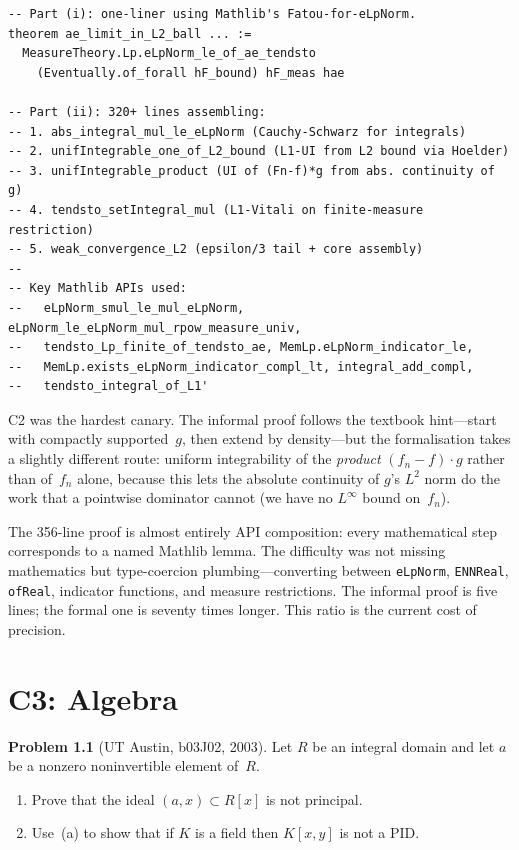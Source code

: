 \documentclass[12pt,oneside]{book}
\theoremstyle{plain}
\theoremstyle{definition}
\newtheorem{problem}{Problem}[chapter]
\theoremstyle{remark}
\begin{document}
\begin{leanbox}
\begin{Verbatim}[fontsize=\scriptsize]
-- Part (i): one-liner using Mathlib's Fatou-for-eLpNorm.
theorem ae_limit_in_L2_ball ... :=
  MeasureTheory.Lp.eLpNorm_le_of_ae_tendsto
    (Eventually.of_forall hF_bound) hF_meas hae

-- Part (ii): 320+ lines assembling:
-- 1. abs_integral_mul_le_eLpNorm (Cauchy-Schwarz for integrals)
-- 2. unifIntegrable_one_of_L2_bound (L1-UI from L2 bound via Hoelder)
-- 3. unifIntegrable_product (UI of (Fn-f)*g from abs. continuity of g)
-- 4. tendsto_setIntegral_mul (L1-Vitali on finite-measure restriction)
-- 5. weak_convergence_L2 (epsilon/3 tail + core assembly)
--
-- Key Mathlib APIs used:
--   eLpNorm_smul_le_mul_eLpNorm, eLpNorm_le_eLpNorm_mul_rpow_measure_univ,
--   tendsto_Lp_finite_of_tendsto_ae, MemLp.eLpNorm_indicator_le,
--   MemLp.exists_eLpNorm_indicator_compl_lt, integral_add_compl,
--   tendsto_integral_of_L1'
\end{Verbatim}
\end{leanbox}

\begin{notebox}
C2 was the hardest canary. The informal proof follows the textbook
hint---start with compactly supported~$g$, then extend by density---but
the formalisation takes a slightly different route: uniform integrability
of the \emph{product} $(f_n - f) \cdot g$ rather than of~$f_n$ alone,
because this lets the absolute continuity of $g$'s $L^2$ norm do the work
that a pointwise dominator cannot (we have no $L^\infty$ bound on~$f_n$).

The 356-line proof is almost entirely API composition: every mathematical
step corresponds to a named Mathlib lemma. The difficulty was not missing
mathematics but type-coercion plumbing---converting between
\texttt{eLpNorm}, \texttt{ENNReal}, \texttt{ofReal}, indicator functions,
and measure restrictions. The informal proof is five lines; the formal
one is seventy times longer. This ratio is the current cost of precision.
\end{notebox}

\chapter{C3: Algebra}\label{ch:c3}

\begin{problem}[UT Austin, b03J02, 2003]
Let $R$ be an integral domain and let $a$ be a nonzero noninvertible
element of~$R$.
\begin{enumerate}[label=(\alph*)]
\item Prove that the ideal $(a, x) \subset R[x]$ is not principal.
\item Use~(a) to show that if $K$ is a field then $K[x, y]$ is not a PID.
\end{enumerate}
\end{problem}
\end{document}
